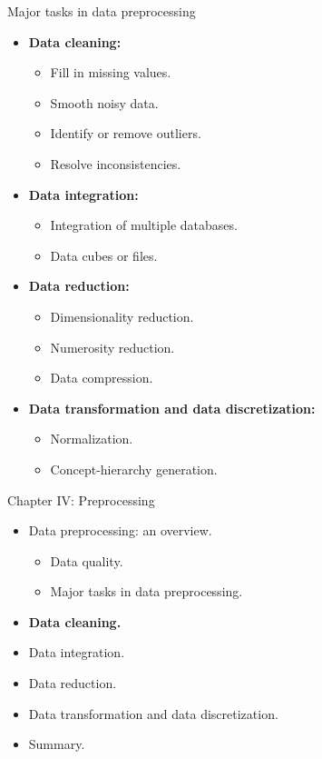 \documentclass[aspectratio=169,t]{beamer}
\begin{document}
  { 
    \begin{frame}{Major tasks in data preprocessing}
      \begin{itemize}
        \item \textbf{Data cleaning:}
        \begin{itemize}
          \item Fill in missing values.
          \item Smooth noisy data.
          \item Identify or remove outliers.
          \item Resolve inconsistencies.
        \end{itemize}
        \item \textbf{Data integration:}
        \begin{itemize}
          \item Integration of multiple databases.
          \item Data cubes or files.
        \end{itemize}
        \item \textbf{Data reduction:}
        \begin{itemize}
          \item Dimensionality reduction.
          \item Numerosity reduction.
          \item Data compression.
        \end{itemize}
        \item \textbf{Data transformation and data discretization:}
        \begin{itemize}
          \item Normalization.
          \item Concept-hierarchy generation.
        \end{itemize}
      \end{itemize}
    \end{frame}
  }

  { 
    \begin{frame}{Chapter IV: Preprocessing}
        \begin{itemize}
            \item Data preprocessing: an overview.
            \begin{itemize}
              \item Data quality.
              \item Major tasks in data preprocessing.
            \end{itemize}
            \item \textbf{Data cleaning.}
            \item Data integration.
            \item Data reduction.
            \item Data transformation and data discretization.
            \item Summary.
        \end{itemize}
    \end{frame}
  }
\end{document}
